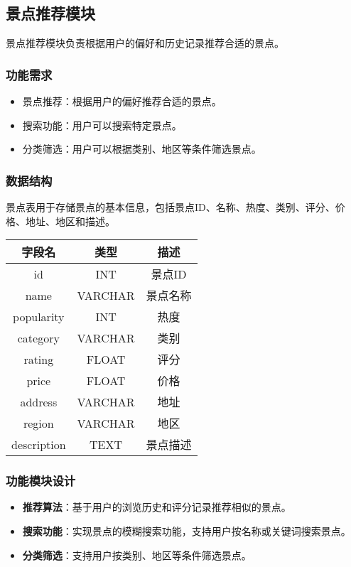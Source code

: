 \documentclass{ctexart}
\begin{document}
\subsection{景点推荐模块}
景点推荐模块负责根据用户的偏好和历史记录推荐合适的景点。

\subsubsection{功能需求}
\begin{itemize}
    \item 景点推荐：根据用户的偏好推荐合适的景点。
    \item 搜索功能：用户可以搜索特定景点。
    \item 分类筛选：用户可以根据类别、地区等条件筛选景点。
\end{itemize}

\subsubsection{数据结构}
景点表用于存储景点的基本信息，包括景点ID、名称、热度、类别、评分、价格、地址、地区和描述。

\begin{center}
    \begin{tabular}{ccc}
        \toprule
        字段名         & 类型      & 描述   \\
        \midrule
        id          & INT     & 景点ID \\
        name        & VARCHAR & 景点名称 \\
        popularity  & INT     & 热度   \\
        category    & VARCHAR & 类别   \\
        rating      & FLOAT   & 评分   \\
        price       & FLOAT   & 价格   \\
        address     & VARCHAR & 地址   \\
        region      & VARCHAR & 地区   \\
        description & TEXT    & 景点描述 \\
        \bottomrule
    \end{tabular}
\end{center}

\subsubsection{功能模块设计}
\begin{itemize}
    \item \textbf{推荐算法}：基于用户的浏览历史和评分记录推荐相似的景点。
    \item \textbf{搜索功能}：实现景点的模糊搜索功能，支持用户按名称或关键词搜索景点。
    \item \textbf{分类筛选}：支持用户按类别、地区等条件筛选景点。
\end{itemize}
\end{document}
